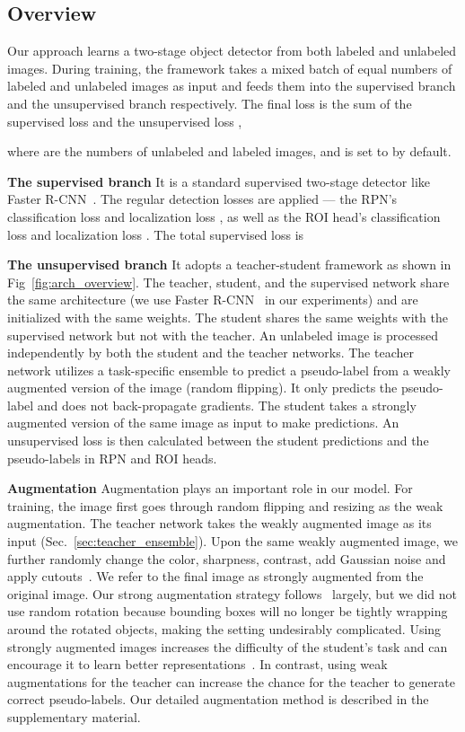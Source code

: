 \documentclass[final]{cvpr}
\begin{document}
\subsection{Overview}
Our approach learns a two-stage object detector from both labeled and unlabeled images.
During training, the framework takes a mixed batch of equal numbers of labeled and unlabeled images as input and feeds them into the supervised branch and the unsupervised branch respectively.
The final loss  is the sum of the supervised loss  and the unsupervised loss ,

where  are the numbers of unlabeled and labeled images, and  is set to  by default.

\noindent\textbf{The supervised branch} 
It is a standard supervised two-stage detector like Faster R-CNN~\cite{ren2015faster}.
The regular detection losses are applied ---
the RPN's classification loss  and localization loss , as well as the ROI head's classification loss  and localization loss .
The total supervised loss is


\noindent\textbf{The unsupervised branch} It adopts a teacher-student framework as shown in Fig~\ref{fig:arch_overview}.
The teacher, student, and the supervised network share the same architecture (we use Faster R-CNN~\cite{ren2015faster} in our experiments) and are initialized with the same weights.
The student shares the same weights with the supervised network but not with the teacher.
An unlabeled image is processed independently by both the student and the teacher networks.
The teacher network utilizes a task-specific ensemble to predict a pseudo-label from a weakly augmented version of the image (random flipping).
It only predicts the pseudo-label and does not back-propagate gradients.
The student takes a strongly augmented version of the same image as input to make predictions. 
An unsupervised loss  is then calculated between the student predictions and the pseudo-labels in RPN and ROI heads.

\noindent\textbf{Augmentation} Augmentation plays an important role in our model.
For training, the image first goes through random flipping and resizing as the weak augmentation.  
The teacher network takes the weakly augmented image as its input (Sec.~\ref{sec:teacher_ensemble}).
Upon the same weakly augmented image, we further randomly change the color, sharpness, contrast, add Gaussian noise and apply cutouts~\cite{devries2017improved}.
We refer to the final image as strongly augmented from the original image. 
Our strong augmentation strategy follows~\cite{sohn2020simple} largely, but we did not use random rotation because bounding boxes will no longer be tightly wrapping around the rotated objects, making the setting undesirably complicated. 
Using strongly augmented images increases the difficulty of the student's task and can encourage it to learn better representations~\cite{shorten2019survey}. 
In contrast, using weak augmentations for the teacher can increase the chance for the teacher to generate correct pseudo-labels. 
Our detailed augmentation method is described in the supplementary material.
\end{document}
